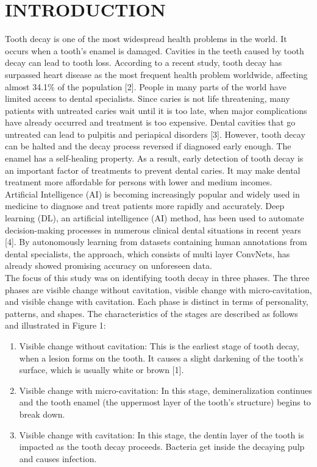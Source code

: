 
\chapter{INTRODUCTION}


Tooth decay is one of the most widespread health problems in the world. It occurs when a tooth's enamel is damaged. Cavities in the teeth caused by tooth decay can lead to tooth loss. According to a recent study, tooth decay has surpassed heart disease as the most frequent health problem worldwide, affecting almost 34.1\% of the population [2]. People in many parts of the world have limited access to dental specialists. Since caries is not life threatening, many patients with untreated caries wait until it is too late, when major complications have already occurred and treatment is too expensive. Dental cavities that go untreated can lead to pulpitis and periapical disorders [3]. However, tooth decay can be halted and the decay process reversed if diagnosed early enough. The enamel has a self-healing property. As a result, early detection of tooth decay is an important factor of treatments to prevent dental caries. It may make dental treatment more affordable for persons with lower and medium incomes.\\
Artificial Intelligence (AI) is becoming increasingly popular and widely used in medicine to diagnose and treat patients more rapidly and accurately. Deep learning (DL), an artificial intelligence (AI) method, has been used to automate decision-making processes in numerous clinical dental situations in recent years [4]. By autonomously learning from datasets containing human annotations from dental specialists, the approach, which consists of multi layer ConvNets, has already showed promising accuracy on unforeseen data.\\
The focus of this study was on identifying tooth decay in three phases. The three phases are visible change without cavitation, visible change with micro-cavitation, and visible change with cavitation. Each phase is distinct in terms of personality, patterns, and shapes. The characteristics of the stages are described as follows and illustrated in Figure 1:
\begin{enumerate}
\item Visible change without cavitation: This is the earliest stage of tooth decay, when a lesion forms on the tooth. It causes a slight darkening of the tooth's surface, which is usually white or brown [1].
\item Visible change with micro-cavitation: In this stage, demineralization continues and the tooth enamel (the uppermost layer of the tooth's structure) begins to break down.
\item Visible change with cavitation: In this stage, the dentin layer of the tooth is impacted as the tooth decay proceeds. Bacteria get inside the decaying pulp and causes infection. 
\end{enumerate}
